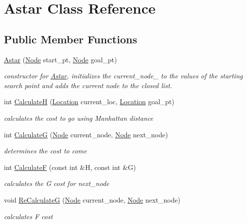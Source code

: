 \hypertarget{classAstar}{}\section{Astar Class Reference}
\label{classAstar}
\subsection*{Public Member Functions}
\begin{DoxyCompactItemize}
\item 
\hyperlink{classAstar_a92ea86949bfcf38f6aba547a543b0c95}{Astar} (\hyperlink{classNode}{Node} start\+\_\+pt, \hyperlink{classNode}{Node} goal\+\_\+pt)
\begin{DoxyCompactList}\small\item\em constructor for \hyperlink{classAstar}{Astar}, initializes the current\+\_\+node\+\_\+ to the values of the starting search point and adds the current node to the closed list. \end{DoxyCompactList}\item 
int \hyperlink{classAstar_aca8b2e61d8825d9f2a6598234987b974}{CalculateH} (\hyperlink{structLocation}{Location} current\+\_\+loc, \hyperlink{structLocation}{Location} goal\+\_\+pt)
\begin{DoxyCompactList}\small\item\em calculates the cost to go using Manhattan distance \end{DoxyCompactList}\item 
int \hyperlink{classAstar_a5c562607083127a12c9a271e88e973d4}{CalculateG} (\hyperlink{classNode}{Node} current\+\_\+node, \hyperlink{classNode}{Node} next\+\_\+node)
\begin{DoxyCompactList}\small\item\em determines the cost to come \end{DoxyCompactList}\item 
int \hyperlink{classAstar_ab8a375a75508deeff448a073064aa1fe}{CalculateF} (const int \&H, const int \&G)
\begin{DoxyCompactList}\small\item\em calculates the G cost for next\+\_\+node \end{DoxyCompactList}\item 
void \hyperlink{classAstar_aaf63d830e7e760ec0a687584ae4b777f}{Re\+CalculateG} (\hyperlink{classNode}{Node} current\+\_\+node, \hyperlink{classNode}{Node} next\+\_\+node)
\begin{DoxyCompactList}\small\item\em calculates F cost \end{DoxyCompactList}\item 

\end{DoxyCompactItemize}
